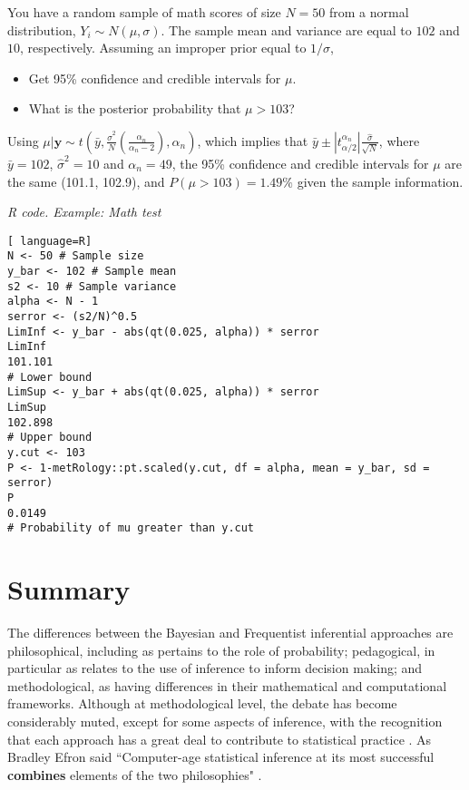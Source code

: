 You have a random sample of math scores of size $N=50$ from a normal distribution, $Y_i\sim {N}(\mu, \sigma)$. The sample mean and variance are equal to $102$ and $10$, respectively. Assuming an improper prior equal to $1/\sigma$, 

\begin{itemize}
	\item Get 95\% confidence and credible intervals for $\mu$.
	\item What is the posterior probability that $\mu > 103$?  
\end{itemize}

Using $\mu|\mathbf{y}\sim t\left(\bar{y},\frac{\hat{\sigma}^2}{N}\left(\frac{\alpha_n}{\alpha_n-2}\right),\alpha_n\right)$, which implies that $\bar{y}\pm |t_{\alpha/2}^{\alpha_n}|\frac{\hat{\sigma}}{\sqrt{N}}$, where $\bar{y}=102$, $\hat{\sigma}^2=10$ and $\alpha_n=49$, the 95\% confidence and credible intervals for $\mu$ are the same (101.1, 102.9), and $P(\mu>103)=1.49\%$ given the sample information.

\begin{tcolorbox}[enhanced,width=4.67in,center upper,
	fontupper=\large\bfseries,drop shadow southwest,sharp corners]
	\textit{R code. Example: Math test}
\begin{VF}
\begin{lstlisting}[ language=R]
N <- 50 # Sample size
y_bar <- 102 # Sample mean
s2 <- 10 # Sample variance
alpha <- N - 1
serror <- (s2/N)^0.5 
LimInf <- y_bar - abs(qt(0.025, alpha)) * serror
LimInf
101.101
# Lower bound
LimSup <- y_bar + abs(qt(0.025, alpha)) * serror
LimSup
102.898
# Upper bound
y.cut <- 103
P <- 1-metRology::pt.scaled(y.cut, df = alpha, mean = y_bar, sd = serror)
P
0.0149
# Probability of mu greater than y.cut
\end{lstlisting}
\end{VF}
\end{tcolorbox}



\section{Summary}\label{sec27}

The differences between the Bayesian and Frequentist inferential approaches are philosophical, including as pertains to the role of probability; pedagogical, in particular as relates to the use of inference to inform decision making; and methodological, as having differences in their mathematical and computational frameworks. Although at methodological level, the debate has become considerably muted, except for some aspects of inference, with the recognition that each approach has a great deal to contribute to statistical practice \cite{Good1992, Bayarri2004, Kass2011}. As Bradley Efron said ``Computer-age statistical inference at its most successful \textbf{combines} elements of the two philosophies" \cite{efron2016computer}.


